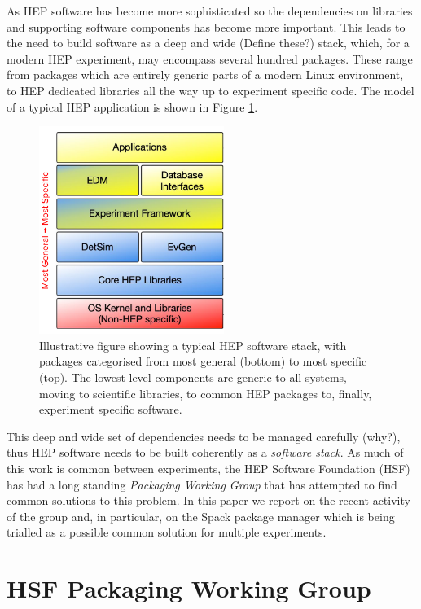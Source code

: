 \documentclass{webofc}
\begin{document}
As HEP software has become more sophisticated so the dependencies on libraries
and supporting software components has become more important. This leads to the need to
build software as a deep and wide (Define these?) stack, which, for a modern HEP experiment, may
encompass several hundred packages. These range from packages which are entirely generic
parts of a modern Linux environment, to HEP dedicated libraries all the way up to
experiment specific code. The model of a typical HEP application is shown in
Figure \ref{fig:stack}.

\begin{figure}[h]
\centering
\includegraphics[width=6cm]{stack.png}
\caption{Illustrative figure showing a typical HEP software stack, with packages
categorised from most general (bottom) to most specific (top). The lowest level
components are generic to all systems, moving to scientific libraries, to common
HEP packages to, finally, experiment specific software.}
\label{fig:stack}
\end{figure}

This deep and wide set of dependencies needs to be managed carefully (why?), thus HEP
software needs to be built coherently as a \emph{software stack}. As much of
this work is common between experiments, the HEP Software Foundation (HSF) has
had a long standing \emph{Packaging Working Group}\cite{HSFPWG} that has attempted to find
common solutions to this problem. In this paper we report on the recent activity
of the group and, in particular, on the Spack package manager\cite{10.1145/2807591.2807623} which is being
trialled as a possible common solution for multiple experiments.

\section{HSF Packaging Working Group}
\label{hsfpwg}
\end{document}
